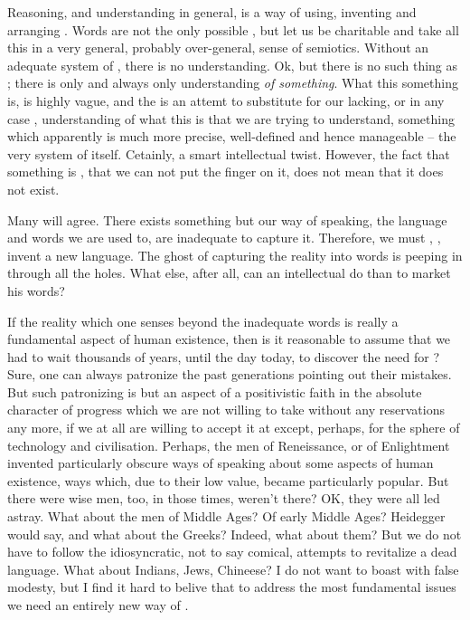 {\pa
Reasoning, and understanding in general, is a way of using, inventing 
and arranging . Words are not the only possible , 
but let us be charitable and take all this  in a 
very general, probably over-general, sense of semiotics. Without an 
adequate system of , there is no understanding. Ok, but 
there is no such thing as ; there is only and 
always only understanding {\em of something}. What this something is, 
is highly vague, and the  is an attemt to 
substitute for our lacking, or in any case , understanding 
of what this is that we are trying to understand, something which 
apparently is much more precise, well-defined and hence manageable -- 
the very system of  itself. Cetainly, a smart intellectual 
twist. However, the fact that something is , that we can 
not put the finger on it, does not mean that it does not exist. 

\pa Many  will agree.  There exists
something but our way of speaking, the language and words we are used
to, are inadequate to capture it.  Therefore, we must , , invent a new language.  The ghost
of capturing the reality into words is peeping in through all the
holes.  What else, after all, can an intellectual do than to market
his words?  

If the reality which one senses beyond the inadequate words is
really a fundamental aspect of human existence, then is it reasonable
to assume that we had to wait thousands of years, until the day today,
to discover the need for ?  Sure, one can
always patronize the past generations pointing out their mistakes. 
But such patronizing is but an aspect of a positivistic faith in the
absolute character of progress which we are not willing to take
without any reservations any more, if we at all are willing to accept
it at except, perhaps, for the sphere of technology and civilisation. 
Perhaps, the men of Reneissance, or of Enlightment invented
particularly obscure ways of speaking about some aspects of human
existence, ways which, due to their low value, became particularly
popular.  But there were wise men, too, in those times, weren't there? 
OK, they were all led astray.  What about the men of Middle Ages?  Of
early Middle Ages?  Heidegger would say, and what about the Greeks? 
Indeed, what about them?  But we do not have to follow the
idiosyncratic, not to say comical, attempts to revitalize a dead
language.  What about Indians, Jews, Chineese?  I do not want to boast
with false modesty, but I find it hard to belive that to address the
most fundamental issues we need an entirely new way of .

}
